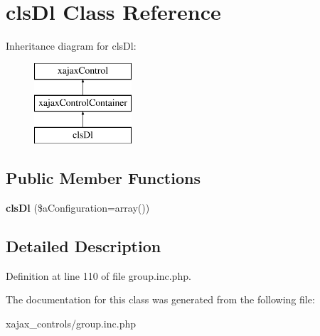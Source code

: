 \hypertarget{classclsDl}{
\section{clsDl Class Reference}
\label{classclsDl}
}
Inheritance diagram for clsDl:\begin{figure}[H]
\begin{center}
\leavevmode
\includegraphics[height=3.000000cm]{classclsDl}
\end{center}
\end{figure}
\subsection*{Public Member Functions}
\begin{DoxyCompactItemize}
\item 
\hypertarget{classclsDl_a81e6adce5c22659e12c1ad7c8659b841}{
{\bfseries clsDl} (\$aConfiguration=array())}
\label{classclsDl_a81e6adce5c22659e12c1ad7c8659b841}

\end{DoxyCompactItemize}


\subsection{Detailed Description}


Definition at line 110 of file group.inc.php.



The documentation for this class was generated from the following file:\begin{DoxyCompactItemize}
\item 
xajax\_\-controls/group.inc.php\end{DoxyCompactItemize}
